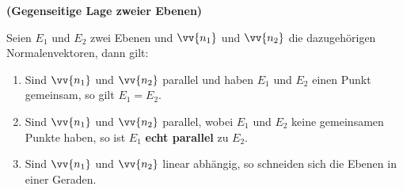 \documentclass[ngerman, 12pt]{nssheetxea}
\begin{document}
\begin{theorem} \textbf{(Gegenseitige Lage zweier Ebenen) } \par
Seien $E_1$ und $E_2$ zwei Ebenen und $\vv{n_1}$ und $\vv{n_2}$ die dazugehörigen Normalenvektoren, dann gilt:
\begin{enumerate}
\item Sind $\vv{n_1}$ und $\vv{n_2}$ parallel und haben $E_1$ und $E_2$ einen Punkt gemeinsam, so gilt $E_1=E_2$.
\item Sind $\vv{n_1}$ und $\vv{n_2}$ parallel, wobei $E_1$ und $E_2$ keine gemeinsamen Punkte haben, so ist $E_1$ \textbf{echt parallel} zu $E_2$.
\item Sind $\vv{n_1}$ und $\vv{n_2}$ linear abhängig, so schneiden sich die Ebenen in einer Geraden.
\end{enumerate}
\end{theorem}
\end{document}

